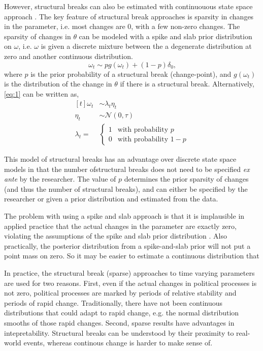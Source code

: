 \documentclass{article}
\newcommand{\paren}[1]{\ensuremath{\left(#1\right)}}
\newcommand{\dnorm}[1]{\ensuremath{\mathcal{N}\paren{#1}}}
\begin{document}
However, structural breaks can also be estimated with continuouous state space approach \parencite{GiordaniKohn2008}.
The key feature of structural break approaches is sparsity in changes in the parameter, i.e. most changes are 0, with a few non-zero changes.
The sparsity of changes in $\theta$ can be modeled with a spike and slab prior distribution on $\omega$,
i.e. $\omega$ is given a discrete mixture between the a degenerate distribution at zero and another continuous distribution.
\begin{equation}
  \label{eq:1}
  \omega_{t} \sim p g(\omega_{t}) + (1 - p) \delta_{0} \text{,}
\end{equation}
where $p$ is the prior probability of a structural break (change-point), and $g(\omega_{t})$ is the distribution of the change in $\theta$ if there is a structural break.
Alternatively, \eqref{eq:1} can be written as,
\begin{equation}
  \label{eq:7}
  \begin{aligned}[t]
    \omega_{t} & \sim \lambda_{t} \eta_{t} \\
    \eta_{t} & \sim \dnorm{0, \tau} \\
    \lambda_{t} = & 
    \begin{cases}
      1 & \text{with probability $p$} \\
      0 & \text{with probability $1 - p$}
    \end{cases}
  \end{aligned}
\end{equation}

This model of structural breaks has an advantage over discrete state space models in that the number ofstructural breaks does not need to be specified \textit{ex ante} by the researcher.
The value of $p$ determines the prior sparsity of changes (and thus the number of structural breaks), and can either be specified by the researcher or given a prior distribution and estimated from the data.

The problem with using a spike and slab approach is that it is implausible in applied practice that the actual changes in the parameter are exactly zero, violating the assumptions of the spike and slab prior distribution \parencite{Gelman2013}.
Also practically, the posterior distribution from a spike-and-slab prior will not put a point mass on zero.
So it may be easier to estimate a continuous distribution that 

In practice, the structural break (sparse) approaches to time varying parameters are used for two reasons.
First, even if the actual changes in political processes is not zero, political processes are marked by periods of relative stability and periods of rapid change.
Traditionally, there have not been continuous distributions that could adapt to rapid change, e.g. the normal distribution smooths of those rapid changes.
Second, sparse results have advantages in intepretability.
Structural breaks can be understood by their proximity to real-world events, whereas continous change is harder to make sense of.
\end{document}
